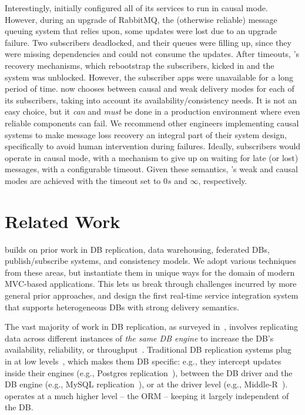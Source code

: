  Interestingly, \crowdtap initially
configured all of its services to run in causal mode.  However, during an
upgrade of RabbitMQ, the (otherwise reliable) message queuing system that
\synapse relies upon, some updates were lost due to an upgrade failure.
Two subscribers deadlocked, and their queues were filling up, since they were
missing dependencies and could not consume the updates.  After timeouts, \synapse's
recovery mechanisms, which rebootstrap the subscribers, kicked in
and the system was unblocked.  However, the subscriber apps were unavailable for
a long period of time. \crowdtap now chooses between causal and weak delivery
modes for each of its subscribers, taking into account its availability/consistency
needs.  It is not an easy choice, but it {\em can} and {\em must}
be done in a production environment where even reliable components can fail.
We recommend other engineers implementing causal systems to make message loss
recovery an \mbox{integral} part of their system design, specifically to avoid human
intervention during failures.
Ideally, subscribers would operate in causal mode, with a mechanism to give up
on waiting for late (or lost) messages, with a configurable timeout.
Given these semantics, \synapse's weak and causal modes are achieved with
the timeout set to $0s$ and $\infty$, respectively.

\section{Related Work}  
\label{sec:related}


\synapse builds on prior work in
DB replication, data warehousing, federated
DBs, publish/subscribe systems, and consistency models. We adopt various techniques from
these areas, but instantiate them in unique ways for the domain of modern
MVC-based applications. This lets us break through challenges incurred by more
general prior approaches, and design the first real-time service integration
system that supports heterogeneous DBs with strong delivery semantics.

The vast majority of work in DB
replication, as surveyed in~\cite{candea-db-replication}, involves replicating data 
across different instances of {\em the same DB engine} to increase the DB's
availability, reliability, or throughput~\cite{pnuts}. Traditional DB replication systems
plug in at low levels~\cite{candea-db-replication}, which makes them DB
specific: e.g., they intercept updates inside their engines (e.g., Postgres
replication~\cite{postgres-r}), between the DB driver and the DB engine (e.g.,
MySQL replication~\cite{mysql-replication}), or at the driver level (e.g.,
Middle-R~\cite{middle-r}).  \synapse operates at a much higher level -- the
ORM -- keeping it largely independent of the DB.

